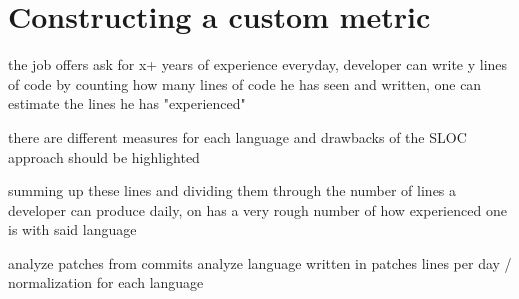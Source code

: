\section{Constructing a custom metric}
the job offers ask for x+ years of experience
everyday, developer can write y lines of code
by counting how many lines of code he has seen and written, one can estimate
the lines he has "experienced"

there are different measures for each language and drawbacks of the SLOC approach
should be highlighted

summing up these lines and dividing them through the number of lines a developer can produce daily, on has a very rough number of how experienced one is with said language

analyze patches from commits
analyze language written in patches
lines per day / normalization for each language
